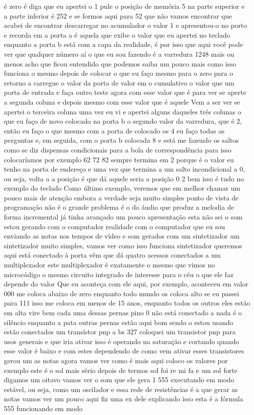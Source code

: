 \documentclass[oneside,11pt]{memoir} %
\begin{document}
é zero é  diga que eu apertei o 1 pule o  posição de memória 5 na parte superior e  a parte inferior é 252 e se formos aqui para 52  que não vamos encontrar que acabei de encontrar  descarregar no acumulador o valor 1 e  apresentou-o no porto e recorda em  a porta a é aquela que exibe o valor  que eu apertei no teclado  enquanto a porta b está com a capa  da realidade, é por isso que aqui você pode ver que  qualquer número aí o que eu sou  fazendo é a varredura 1248  mais ou menos acho que ficou entendido que podemos  saiba um pouco mais como isso funciona  o mesmo depois de colocar o que eu faço  mesmo para o zero para o retorno a  carregue o valor da porta de valor em  o cumulativo o valor que um  porta de entrada e faça outro teste  agora com esse valor que é para ver se  aperte a segunda coluna e depois  mesmo com esse valor que é aquele  Vem a ser ver se apertei o  terceira coluna  uma vez eu vi e apertei alguns daqueles  três colunas o que eu faço de novo  colocado na porta b o segundo valor  da varredura, que é 2, então eu faço o que  mesmo com a porta de colocado os 4 eu faço  todas as perguntas e, em seguida, com o  porta b colocada 8 e está me fazendo  os saltos  como se diz dispensas condicionais  para a bola de correspondência para isso  colocaríamos por exemplo 62 72 82  sempre termina em 2 porque é o valor  eu tenho na porta de endereço e  uma vez que termina a um salto  incondicional a 0, ou seja, volta a  a posição é que dá aquele  seria a posição 0 2 bem isso é tudo  no exemplo do teclado  Como último exemplo, veremos que em  melhor chamar um pouco mais de atenção  embora a verdade seja muito simples  ponto de vista de programação não é  o grande problema é o do áudio que  produz a melodia de forma incremental  já tinha avançado um pouco  apresentação esta não sei o som  estou gerando com o computador  realidade com o computador que eu sou  enviando as notas nos tempos de  vídeo e som gerados com um  sintetizador um sintetizador muito  simples, vamos ver como isso funciona  sintetizador queremos aqui está  conectado à porta vêm que dá quatro  acessos conectados a um multiplexador este  multiplexador é exatamente o mesmo que  vimos no microcódigo o mesmo  circuito integrado de interesse para o céu  o que ele faz depende do valor  Que eu aconteça com ele aqui, por exemplo, aconteceu em  valor 000 me coloca abaixo de zero  enquanto todo mundo os coloca  alto se eu passei para 111 isso me coloca em  menos de 15 anos, enquanto todos os outros  eles estão em alta  vire bem cada uma dessas pernas  pino 0 não está conectado a nada  é o silêncio enquanto a pata  outras pernas estão aqui bom sendo o  estou usando estão conectados um  transístor pnp a bs  327 coloquei um transistor pnp para usos  generais e que iria ativar isso é  operando na saturação e cortando quando  esse valor é baixo  e com estes dependendo de como vem  ativar esses transistores gerou um  as notas agora vamos ver como é mais  aqui coloco os valores por exemplo  este é o sol mais sério depois de termos  sol foi re mi fa e um sol forte  digamos um oitavo  vamos ver o som que ele gera 1 555  executando em modo estável, ou seja,  como um oscilador  e essa rede de resistências é a que  gerar as notas vamos ver um pouco  aqui fiz uma ex dele explicando isso  esta é a fórmula 555 funcionando  em modo 
\end{document}
